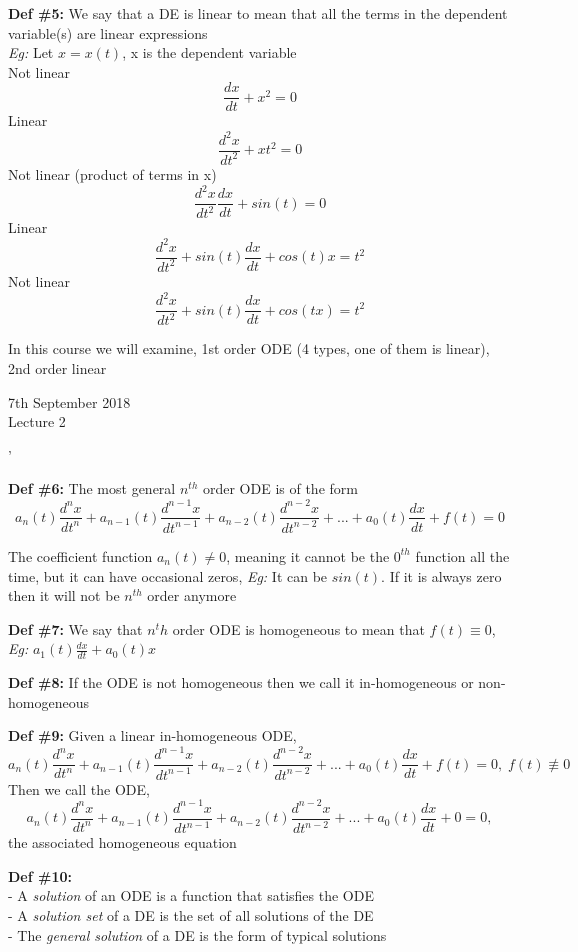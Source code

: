\documentclass[11pt]{article}
\theoremstyle{definition}
\begin{document}
\textbf{Def \#5:} We say that a DE is linear to mean that all the terms in the dependent variable(s) are linear expressions\\
\textit{Eg:} Let $x = x(t)$, x is the dependent variable\\
Not linear
$$\frac{dx}{dt} + x^2 = 0$$  
Linear
$$\frac{d^2x}{dt^2} + xt^2 = 0$$ 
Not linear (product of terms in x)
$$\frac{d^2x}{dt^2}\frac{dx}{dt} + sin(t) = 0$$ 
Linear
$$\frac{d^2x}{dt^2}+ sin(t)\frac{dx}{dt} + cos(t)x = t^2$$ 
Not linear
$$\frac{d^2x}{dt^2}+ sin(t)\frac{dx}{dt} + cos(tx) = t^2$$ 

In this course we will examine, 1st order ODE (4 types, one of them is linear), 2nd order linear
\newpage
\begin{center}
    {\LARGE 7th September 2018 \\ Lecture 2}
\end{center}'

\textbf{Def \#6:} The most general $n^{th}$ order ODE is of the form 
$$a_n(t)\frac{d^nx}{dt^n} + a_{n-1}(t)\frac{d^{n-1}x}{dt^{n-1}} + a_{n-2}(t)\frac{d^{n-2}x}{dt^{n-2}} + ... + a_0(t)\frac{dx}{dt} + f(t) = 0$$

The coefficient function $a_n(t) \neq 0$, meaning it cannot be the $0^{th}$ function all the time, but it can have occasional zeros, \textit{Eg:} It can be $sin(t)$. If it is always zero then it will not be $n^{th}$ order anymore

\textbf{Def \#7:} We say that $n^th$ order ODE is homogeneous to mean that $f(t) \equiv 0$, \textit{Eg:} $a_1(t) \frac{dx}{dt} + a_0(t)x$

\textbf{Def \#8:} If the ODE is not homogeneous then we call it in-homogeneous or non-homogeneous

\textbf{Def \#9:} Given a linear in-homogeneous ODE, $$a_n(t)\frac{d^nx}{dt^n} + a_{n-1}(t)\frac{d^{n-1}x}{dt^{n-1}} + a_{n-2}(t)\frac{d^{n-2}x}{dt^{n-2}} + ... + a_0(t)\frac{dx}{dt} + f(t) = 0, \; f(t) \not\equiv 0$$ 
Then we call the ODE, $$a_n(t)\frac{d^nx}{dt^n} + a_{n-1}(t)\frac{d^{n-1}x}{dt^{n-1}} + a_{n-2}(t)\frac{d^{n-2}x}{dt^{n-2}} + ... + a_0(t)\frac{dx}{dt} + 0 = 0,$$ the associated homogeneous equation

\textbf{Def \#10:}\\
- A \textit{solution} of an ODE is a function that satisfies the ODE \\
- A \textit{solution set} of a DE is the set of all solutions of the DE \\
- The \textit{general solution} of a DE is the form of typical solutions
\end{document}
